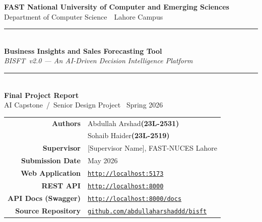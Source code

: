 \documentclass[conference]{IEEEtran}
\begin{document}
\onecolumn
\thispagestyle{empty}
\begin{center}

{\large\bfseries FAST National University of Computer and Emerging Sciences}\\[3pt]
{\normalsize Department of Computer Science\ \textbullet\ Lahore Campus}

\vspace{0.9cm}
{\color{bisftBlue}\rule{\textwidth}{1.8pt}}\\[5pt]

{\LARGE\bfseries Business Insights and Sales Forecasting Tool}\\[6pt]
{\large\itshape BISFT~v2.0 — An AI-Driven Decision Intelligence Platform}\\[5pt]

{\color{bisftBlue}\rule{\textwidth}{1.8pt}}\\[0.7cm]

{\large\bfseries Final Project Report}\\[3pt]
{\normalsize AI Capstone\ /\ Senior Design Project \textbullet\ Spring 2026}

\vspace{1.4cm}

\begin{tabular}{r@{\ \ }l}
  \textbf{Authors}          & Abdullah Arshad\quad\textbf{(23L-2531)}          \\[3pt]
                            & Sohaib Haider\quad\;\textbf{(23L-2519)}           \\[9pt]
  \textbf{Supervisor}       & [Supervisor Name], FAST-NUCES Lahore              \\[9pt]
  \textbf{Submission Date}  & May 2026                                          \\[9pt]
  \textbf{Web Application}  & \href{http://localhost:5173}{\texttt{http://localhost:5173}}       \\[2pt]
  \textbf{REST API}         & \href{http://localhost:8000}{\texttt{http://localhost:8000}}       \\[2pt]
  \textbf{API Docs (Swagger)} & \href{http://localhost:8000/docs}{\texttt{http://localhost:8000/docs}} \\[2pt]
  \textbf{Source Repository}& \href{https://github.com/abdullaharshaddd/business-insights-and-sales-forecasting-tool}%
                              {\texttt{github.com/abdullaharshaddd/bisft}}       \\
\end{tabular}


\end{center}
\end{document}
